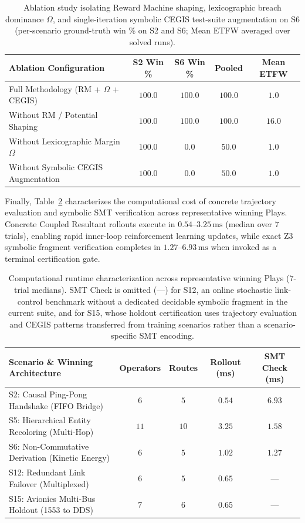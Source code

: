\begin{table}[t]
\centering
\caption{Ablation study isolating Reward Machine shaping, lexicographic breach dominance $\Omega$, and single-iteration symbolic CEGIS test-suite augmentation on S6 (per-scenario ground-truth win \% on S2 and S6; Mean ETFW averaged over solved runs).}
\label{tab:ablations}
\footnotesize
\begin{tabular}{@{}lcccc@{}}
\toprule
\textbf{Ablation Configuration} & \textbf{S2 Win \%} & \textbf{S6 Win \%} & \textbf{Pooled} & \textbf{Mean ETFW} \\
\midrule
Full Methodology (RM + $\Omega$ + CEGIS) & $100.0$ & $100.0$ & $100.0$ & $1.0$ \\
Without RM / Potential Shaping & $100.0$ & $100.0$ & $100.0$ & $16.0$ \\
Without Lexicographic Margin $\Omega$ & $100.0$ & $0.0$ & $50.0$ & $1.0$ \\
Without Symbolic CEGIS Augmentation & $100.0$ & $0.0$ & $50.0$ & $1.0$ \\
\bottomrule
\end{tabular}
\end{table}

Finally, Table~\ref{tab:scale} characterizes the computational cost of concrete trajectory evaluation and symbolic SMT verification across representative winning Plays. Concrete Coupled Resultant rollouts execute in $0.54$--$3.25\,\mathrm{ms}$ (median over $7$ trials), enabling rapid inner-loop reinforcement learning updates, while exact Z3 symbolic fragment verification completes in $1.27$--$6.93\,\mathrm{ms}$ when invoked as a terminal certification gate.

\begin{table}[t]
\centering
\caption{Computational runtime characterization across representative winning Plays ($7$-trial medians). SMT Check is omitted (---) for S12, an online stochastic link-control benchmark without a dedicated decidable symbolic fragment in the current suite, and for S15, whose holdout certification uses trajectory evaluation and CEGIS patterns transferred from training scenarios rather than a scenario-specific SMT encoding.}
\label{tab:scale}
\footnotesize
\begin{tabular}{@{}lcccc@{}}
\toprule
\textbf{Scenario \& Winning Architecture} & \textbf{Operators} & \textbf{Routes} & \textbf{Rollout (ms)} & \textbf{SMT Check (ms)} \\
\midrule
S2: Causal Ping-Pong Handshake (FIFO Bridge) & $6$ & $5$ & $0.54$ & $6.93$ \\
S5: Hierarchical Entity Recoloring (Multi-Hop) & $11$ & $10$ & $3.25$ & $1.58$ \\
S6: Non-Commutative Derivation (Kinetic Energy) & $6$ & $5$ & $1.02$ & $1.27$ \\
S12: Redundant Link Failover (Multiplexed) & $6$ & $5$ & $0.65$ & --- \\
S15: Avionics Multi-Bus Holdout (1553 to DDS) & $7$ & $6$ & $0.65$ & --- \\
\bottomrule
\end{tabular}
\end{table}
